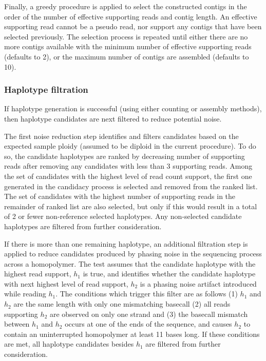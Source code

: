 \documentclass{article}
\begin{document}
Finally, a greedy procedure is applied to select the constructed contigs in the order of the number of effective supporting reads and contig length. An effective supporting read cannot be a pseudo read, nor support any contigs that have been selected previously. The selection process is repeated until either there are no more contigs available with the minimum number of effective supporting reads (defaults to 2), or the maximum number of contigs are assembled (defaults to 10).

\subsubsection{Haplotype filtration}

If haplotype generation is successful (using either counting or assembly methods), then haplotype candidates are next filtered to reduce potential noise.

The first noise reduction step identifies and filters candidates based on the expected sample ploidy (assumed to be diploid in the current procedure). To do so, the candidate haplotypes are ranked by decreasing number of supporting reads after removing any candidates with less than 3 supporting reads. Among the set of candidates with the highest level of read count support, the first one generated in the candidacy process is selected and removed from the ranked list. The set of candidates with the highest number of supporting reads in the remainder of ranked list are also selected, but only if this would result in a total of 2 or fewer non-reference selected haplotypes. Any non-selected candidate haplotypes are filtered from further consideration.

If there is more than one remaining haplotype, an additional filtration step is applied to reduce candidates produced by phasing noise in the sequencing process across a homopolymer. The test assumes that the candidate haplotype with the highest read support, $h_1$ is true, and identifies whether the candidate haplotype with next highest level of read support, $h_2$ is a phasing noise artifact introduced while reading $h_1$. The conditions which trigger this filter are as follows (1) $h_1$ and $h_2$ are the same length with only one mismatching basecall (2) all reads supporting $h_2$ are observed on only one strand and (3) the basecall mismatch between $h_1$ and $h_2$ occurs at one of the ends of the sequence, and causes $h_2$ to contain an uninterrupted homopolymer at least 11 bases long. If these conditions are met, all haplotype candidates besides $h_1$ are filtered from further consideration.
\end{document}
